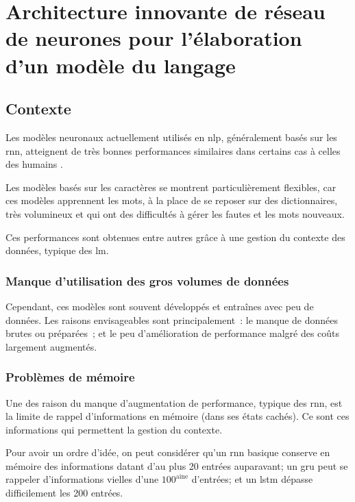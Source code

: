 
\chapter{Architecture innovante de réseau de neurones pour l'élaboration d'un modèle du langage\label{ch:project_gmsnn}}
\section{Contexte}
Les modèles neuronaux actuellement utilisés en \gls{nlp}, généralement basés sur les \gls{rnn}, atteignent de très bonnes performances similaires dans certains cas à celles des humains \autocite{rnn_perf,UnreasonableRNN,JozefowiczVSSW16}.

Les modèles basés sur les caractères se montrent particulièrement flexibles, car ces modèles \og apprennent\fg{} les mots, à la place de se reposer sur des dictionnaires, très volumineux et qui ont des difficultés à gérer les fautes et les mots nouveaux.

Ces performances sont obtenues entre autres grâce à une gestion du contexte des données, typique des \gls{lm}.

\subsection{Manque d'utilisation des gros volumes de données}
Cependant, ces modèles sont souvent développés et entraînes avec peu de données.
Les raisons envisageables sont principalement~: le manque de données brutes ou préparées~; et le peu d'amélioration de performance malgré des coûts largement augmentés.

\subsection{Problèmes de mémoire}\label{subsec:mempb}
Une des raison du manque d'augmentation de performance, typique des \gls{rnn}, est la limite de rappel d'informations en \og mémoire\fg{} (dans ses états cachés). Ce sont ces informations qui permettent la gestion du contexte.

Pour avoir un ordre d'idée, on peut considérer qu'un \gls{rnn} basique conserve en mémoire des informations datant d'au plus 20 entrées auparavant; un \gls{gru} peut se rappeler d'informations vielles d'une $100^\text{aine}$ d'entrées; et un \gls{lstm} dépasse difficilement les 200 entrées.

